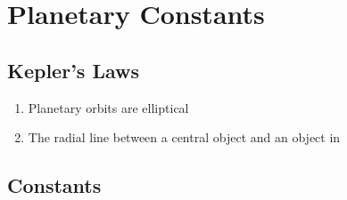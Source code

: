 \documentclass{article}
\begin{document}
\newcommand{\hr}{\par\noindent\rule{\textwidth}{0.4pt}}

\newcommand{\bc}[1]{
	\begin{equation*}
		\begin{boxed}
			{#1}
		\end{boxed}
	\end{equation*}
}

\newcommand{\cond}[2]{
	\ifmmode
		{#1} \quad {#2}
	\else
		$$ {#1} \quad {#2} $$
	\fi
}

\newcommand{\matr}[1]{
	\ifmmode \bm{#1}
	\else \textit{\textbf{#1}}
	\fi
}
\newcommand{\vect}[1]{
	\ifmmode \mathbf{#1}
	\else \textbf{#1}
	\fi
}

\section{Planetary Constants}

\subsection{Kepler's Laws}

\begin{enumerate}[label = \textbf{Kepler's \arabic* Law:}]
	\item Planetary orbits are elliptical
	\item The radial line between a central object and an object in 
\end{enumerate}

\subsection{Constants}
\end{document}
